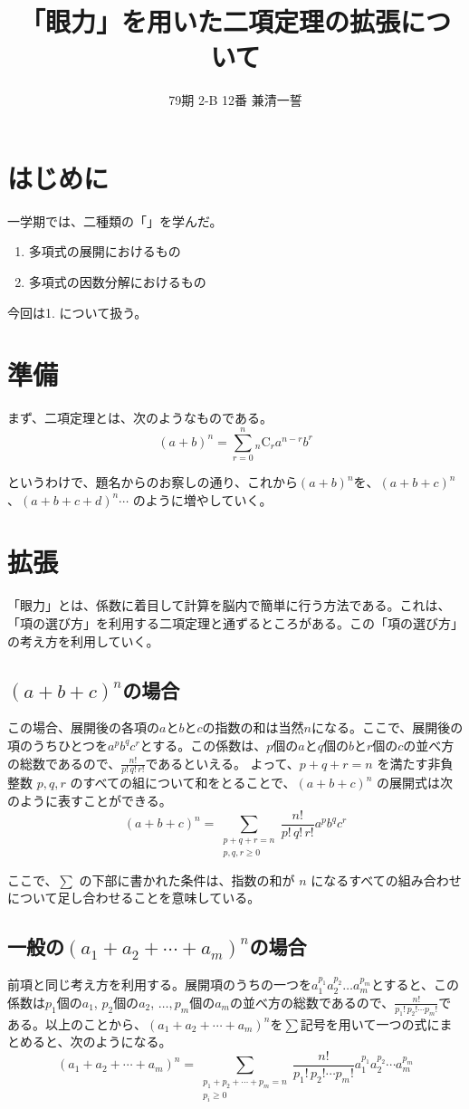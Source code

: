 \documentclass[dvipdfmx]{jlreq}
\begin{document}
\title{「眼力」を用いた二項定理の拡張について}
\date{}
\author{79期 2-B 12番 兼清一誓}
\maketitle
\section{はじめに}
一学期では、二種類の「」を学んだ。
\begin{enumerate}
\item 多項式の展開におけるもの
\item 多項式の因数分解におけるもの
\end{enumerate}

今回は1. について扱う。

\section{準備}
まず、二項定理とは、次のようなものである。
\[(a + b)^n = \sum_{r=0}^{n} {}_n\mathrm{C}_r a^{n-r}b^r\]

というわけで、題名からのお察しの通り、これから$(a+b)^n$を、$(a+b+c)^n$、$(a+b+c+d)^n \cdots$ のように増やしていく。
\section{拡張}
「眼力」とは、係数に着目して計算を脳内で簡単に行う方法である。これは、「項の選び方」を利用する二項定理と通ずるところがある。この「項の選び方」の考え方を利用していく。
\subsection{$(a+b+c)^n$の場合}
この場合、展開後の各項の$a$と$b$と$c$の指数の和は当然$n$になる。ここで、展開後の項のうちひとつを$a^p b^q c^r$とする。この係数は、$p$個の$a$と$q$個の$b$と$r$個の$c$の並べ方の総数であるので、$\displaystyle \frac{n!}{p! \, q! \, r!}$であるといえる。
よって、$p+q+r=n$ を満たす非負整数 $p, q, r$ のすべての組について和をとることで、$(a+b+c)^n$ の展開式は次のように表すことができる。
\[ (a+b+c)^n = \sum_{\substack{p+q+r=n \\ p,q,r \ge 0}} \frac{n!}{p! \, q! \, r!} a^p b^q c^r \]

ここで、$\sum$ の下部に書かれた条件は、指数の和が $n$ になるすべての組み合わせについて足し合わせることを意味している。
\subsection{一般の$(a_1 + a_2 + \cdots + a_m)^n$の場合}
前項と同じ考え方を利用する。展開項のうちの一つを$a_1^{p_1} a_2^{p_2} \dots a_m^{p_m}$とすると、この係数は$p_1$個の$a_1$, $p_2$個の$a_2$, $\dots , p_m$個の$a_m$の並べ方の総数であるので、$\displaystyle \frac{n!}{p_1! \, p_2! \cdots p_m!}$である。以上のことから、$(a_1 + a_2 + \cdots + a_m)^n$を$\sum$記号を用いて一つの式にまとめると、次のようになる。
\[ (a_1 + a_2 + \cdots + a_m)^n = \sum_{\substack{p_1 + p_2 + \cdots + p_m = n \\ p_i \ge 0}} \frac{n!}{p_1! \, p_2! \cdots p_m!}a_1^{p_1} a_2^{p_2} \cdots a_m^{p_m} \]
\end{document}
